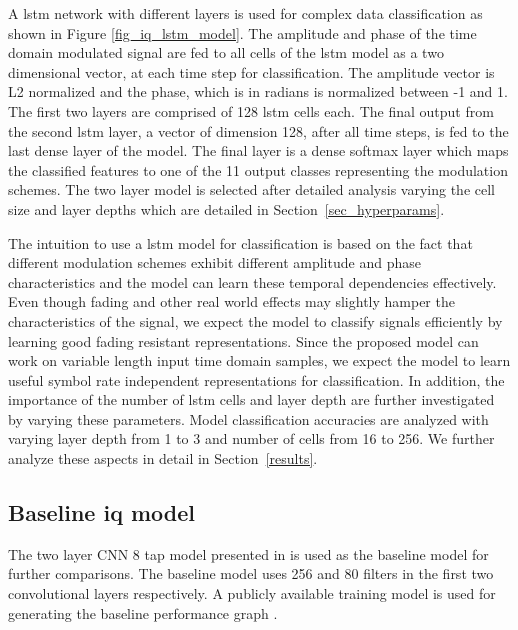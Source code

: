A \ac{lstm} network with different layers is used for complex data classification as shown in Figure \ref{fig_iq_lstm_model}. The amplitude and phase of the time domain modulated signal are fed to all cells of the \ac{lstm} model as a two dimensional vector, at each time step for classification. The amplitude vector is L2 normalized and the phase, which is in radians is normalized between -1 and 1. The first two layers are comprised of 128 \ac{lstm} cells each. The final output from the second \ac{lstm} layer, a vector of dimension 128, after all time steps, is fed to the last dense layer of the model. The final layer is a dense softmax layer which maps the classified features to one of the 11 output classes representing the modulation schemes. The two layer model is selected after detailed analysis varying the cell size and layer depths which are detailed in Section~\ref{sec_hyperparams}. 

The intuition to use a \ac{lstm} model for classification is based on the fact that different modulation schemes exhibit different amplitude and phase characteristics and the model can learn these temporal dependencies effectively. Even though fading and other real world effects may slightly hamper the characteristics of the signal, we expect the model to classify signals efficiently by learning good fading resistant representations.
Since the proposed model can work on variable length input time domain samples, we expect the model to learn useful symbol rate independent representations for classification. In addition, the importance of the number of \ac{lstm} cells and layer depth are further investigated by varying these parameters. Model classification accuracies are analyzed with varying layer depth from 1 to 3 and number of cells from 16 to 256. We further analyze these aspects in detail in Section~\ref{results}.

\subsection{Baseline \ac{iq} model}
The two layer CNN 8 tap model presented in \cite{baseline} is used as the baseline model for further comparisons. The baseline model uses 256 and 80 filters in the first two convolutional layers respectively. A publicly available training model is used for generating the baseline performance graph \cite{o2016convolutional}. %


